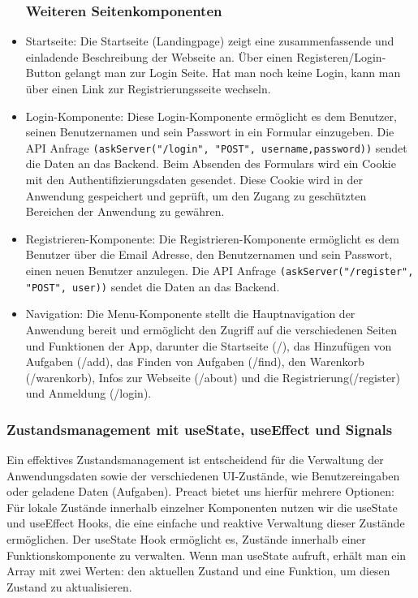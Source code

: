 \begin{itemize}
\subsubsection{Weiteren Seitenkomponenten}

\item Startseite:
 Die Startseite (Landingpage) zeigt eine zusammenfassende und einladende Beschreibung der Webseite an. Über einen Registeren/Login-Button gelangt man zur Login Seite. Hat man noch keine Login, kann man über einen Link zur Registrierungsseite wechseln.

\item Login-Komponente:
Diese Login-Komponente ermöglicht es dem Benutzer, seinen Benutzernamen und sein Passwort in ein Formular einzugeben. Die API Anfrage \texttt{(askServer("/login", "POST", {username,password}))} sendet die Daten an das Backend.
Beim Absenden des Formulars wird ein Cookie mit den Authentifizierungsdaten gesendet. Diese Cookie wird in der Anwendung gespeichert und geprüft, um den Zugang zu geschützten Bereichen der Anwendung zu gewähren.


\item Registrieren-Komponente:
Die Registrieren-Komponente ermöglicht es dem Benutzer über die Email Adresse, den Benutzernamen und sein Passwort, einen neuen Benutzer anzulegen. Die API Anfrage \texttt{(askServer("/register", "POST", user))} sendet die Daten an das Backend.

\item Navigation:
Die Menu-Komponente stellt die Hauptnavigation der Anwendung bereit und ermöglicht den Zugriff auf die verschiedenen Seiten und Funktionen der App, darunter die Startseite (/), das Hinzufügen von Aufgaben (/add), das Finden von Aufgaben (/find), den Warenkorb (/warenkorb), Infos zur Webseite (/about) und die Registrierung(/register) und Anmeldung (/login).


\end{itemize}


\subsubsection{Zustandsmanagement mit useState, useEffect und Signals}


Ein effektives Zustandsmanagement ist entscheidend für die Verwaltung der Anwendungsdaten sowie der verschiedenen UI-Zustände, wie Benutzereingaben oder geladene Daten (Aufgaben). Preact bietet uns hierfür mehrere Optionen: Für lokale Zustände innerhalb einzelner Komponenten nutzen wir die useState und useEffect Hooks, die eine einfache und reaktive Verwaltung dieser Zustände ermöglichen. 
Der useState Hook ermöglicht es, Zustände innerhalb einer Funktionskomponente zu verwalten. Wenn man useState aufruft, erhält man ein Array mit zwei Werten: den aktuellen Zustand und eine Funktion, um diesen Zustand zu aktualisieren.

